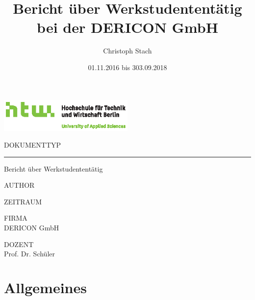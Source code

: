 \documentclass[chapterprefix=false, 12pt, a4paper, oneside, parskip=half, listof=totoc, bibliography=totoc, numbers=noendperiod]{scrbook}
\title{Bericht über Werkstudententätig bei der DERICON GmbH}
\author{Christoph Stach}
\date{01.11.2016 bis 303.09.2018}
\begin{document}
    \begin{titlepage}
        \includegraphics[width=0.50\textwidth]{img/Q01_HTW_Berlin_Logo_quer_pos_FARBIG_CMYK.eps}

        \vspace{4.0cm}

        \begin{changemargin}{0.5cm}{0.0cm}
        \color{htwgrau}
        \normalsize
        \textsf{\noindent\MakeUppercase{Dokumenttyp}} \vspace{-20pt}\\
        \noindent\rule{\textwidth}{0.5pt}\vspace{-4pt}
        \color{black}
        \huge
        \textsf{Bericht über Werkstudententätig}
        \vspace{12pt}

        \color{htwgrau}
        \normalsize
        \textsf{\MakeUppercase{Author}}\\
        \color{black}
        \large
        \textsf{\theauthor}

        \color{htwgrau}
        \normalsize
        \textsf{\MakeUppercase{Zeitraum}}\\
        \color{black}
        \large
        \textsf{\thedate}

        \vfill

        \color{htwgrau}
        \normalsize
        \textsf{\MakeUppercase{Firma}}\\
        \color{black}
        \large
        \textsf{DERICON GmbH}

        \color{htwgrau}
        \normalsize
        \textsf{\MakeUppercase{Dozent}}\\
        \color{black}
        \large
        \textsf{Prof. Dr. Schüler}
        \vspace{-60pt}
        \end{changemargin}
    \end{titlepage}

    \tableofcontents

    \chapter{Allgemeines}
\end{document}
